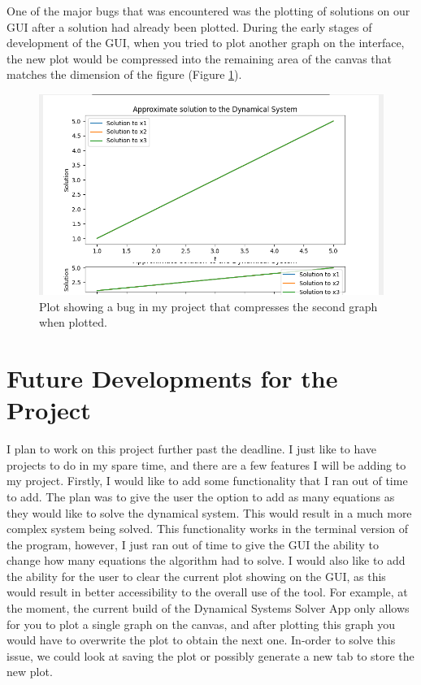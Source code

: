 \documentclass[12pt]{report}
\begin{document}
One of the major bugs that was encountered was the plotting of solutions on our GUI after a solution had already been plotted. During the early stages of development of the GUI, when you tried to plot another graph on the interface, the new plot would be compressed into the remaining area of the canvas that matches the dimension of the figure (Figure \ref*{GUI_B}).
\begin{figure}[H]
    \centering
    \includegraphics[scale = 0.7]{bug.png}
    \caption{Plot showing a bug in my project that compresses the second graph when plotted.}
    \label{GUI_B}
\end{figure}
\section{Future Developments for the Project}
I plan to work on this project further past the deadline. I just like to have projects to do in my spare time, and there are a few features I will be adding to my project. Firstly, I would like to add some functionality that I ran out of time to add. The plan was to give the user the option to add as many equations as they would like to solve the dynamical system. This would result in a much more complex system being solved. This functionality works in the terminal version of the program, however, I just ran out of time to give the GUI the ability to change how many equations the algorithm had to solve. I would also like to add the ability for the user to clear the current plot showing on the GUI, as this would result in better accessibility to the overall use of the tool. For example, at the moment, the current build of the Dynamical Systems Solver App only allows for you to plot a single graph on the canvas, and after plotting this graph you would have to overwrite the plot to obtain the next one. In-order to solve this issue, we could look at saving the plot or possibly generate a new tab to store the new plot.
\smallskip
\end{document}
